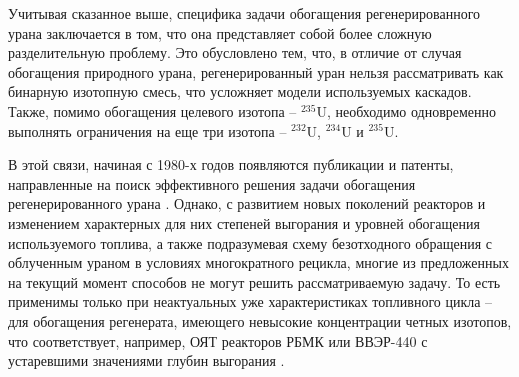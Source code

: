 Учитывая сказанное выше, специфика задачи обогащения регенерированного урана заключается в том, что она представляет собой более сложную разделительную проблему.
Это обусловлено тем, что, в отличие от случая обогащения природного урана, регенерированный уран нельзя рассматривать как бинарную изотопную смесь, что усложняет модели используемых каскадов. Также, помимо обогащения целевого изотопа -- $^{235}$U, необходимо одновременно выполнять ограничения на еще три изотопа -- $^{232}$U, $^{234}$U и $^{235}$U.

В этой связи, начиная с 1980-х годов появляются публикации и патенты, направленные на поиск эффективного решения задачи обогащения регенерированного урана \cite{smirnovKaskadnyeShemyZadachah2012,sulaberidzeNekotoryhRazdelitelnyhProblemah2004,kazukihidaSimultaneousEvaluationEffects1986,sidenkoIssledovanieKaskadnyhShem,smirnovObogashchenieRegenerirovannogoUrana2018,prusakovKorrekciyaIzotopnogoSostava2008}. Однако, с развитием новых поколений реакторов и изменением характерных для них степеней выгорания и уровней обогащения используемого топлива, а также подразумевая схему безотходного обращения с облученным ураном в условиях многократного рецикла,  многие из предложенных на текущий момент способов не могут решить рассматриваемую задачу. То есть применимы только при неактуальных уже характеристиках топливного цикла -- для обогащения регенерата, имеющего невысокие концентрации четных изотопов, что соответствует, например, ОЯТ реакторов РБМК или ВВЭР-440 с устаревшими значениями глубин выгорания \cite{andrianovaPovyshenieVygoraniyaTopliva2008}.

